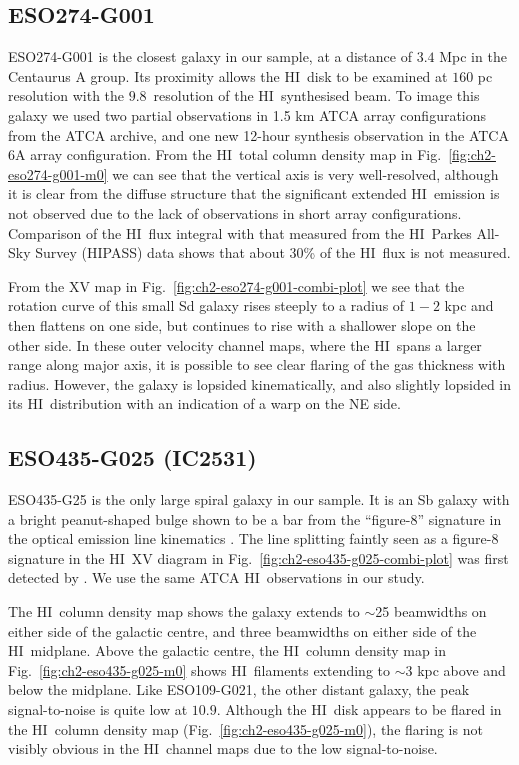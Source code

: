 \documentclass[traditabstract]{aa} %
\newcommand\HI{H{\small I}}
\begin{document}
\subsection{ESO274-G001}

ESO274-G001 is the closest galaxy in our sample, at a distance of
$3.4$ Mpc in the Centaurus A group. Its proximity allows the \HI\ disk
to be examined at $160$ pc resolution with the $9.8$\arcsec\ resolution
of the \HI\ synthesised beam. To image this galaxy we used two partial
observations in 1.5 km ATCA array configurations from the ATCA archive,
and one new 12-hour synthesis observation in the ATCA 6A array
configuration. From the \HI\ total column density map in
Fig.~\ref{fig:ch2-eso274-g001-m0} we can see that the vertical axis
is very well-resolved, although it is clear from the diffuse structure
that the significant extended \HI\ emission is not observed due to the lack
of observations in short array configurations. Comparison of the \HI\
flux integral with that measured from the \HI\ Parkes All-Sky Survey
(HIPASS) data shows that about 30\% of the \HI\ flux is not
measured.

From the XV map in Fig.~\ref{fig:ch2-eso274-g001-combi-plot} we see
that the rotation curve of this small Sd galaxy rises steeply to a radius of 
$1-2$ kpc and then flattens on one side, but continues to rise with a
shallower slope on the other side. In these outer velocity
channel maps, where the \HI\ spans a larger range along major axis, it
is possible to see clear flaring of the gas thickness with radius.
However, the galaxy is lopsided kinematically, and  also slightly 
lopsided in its \HI\ distribution with an indication of a warp on the NE side.

\subsection{ESO435-G025 (IC2531)} %

ESO435-G25 is the only large spiral galaxy in our sample. It is an Sb
galaxy with a bright peanut-shaped bulge shown to be a bar from the
``figure-8'' signature in the optical emission line kinematics
\citep{bf1999}. The line splitting faintly seen as a figure-8
signature in the \HI\ XV diagram in
Fig.~\ref{fig:ch2-eso435-g025-combi-plot} was first detected by
\citet{bf1997}. We use the same ATCA \HI\ observations in our study.

The \HI\ column density map shows the galaxy extends to $\sim$25
beamwidths on either side of the galactic centre, and three beamwidths
on either side of the \HI\ midplane. Above the galactic centre, the \HI\
column density map in Fig.~\ref{fig:ch2-eso435-g025-m0}
shows \HI\ filaments extending to $\sim$3 kpc above and below the
midplane. Like ESO109-G021, the other distant galaxy, the peak
signal-to-noise is quite low at $10.9$.  Although the \HI\ disk appears
to be flared in the \HI\ column density map
(Fig.~\ref{fig:ch2-eso435-g025-m0}), the flaring is not visibly
obvious in the \HI\ channel maps due to the low
signal-to-noise.
\end{document}
